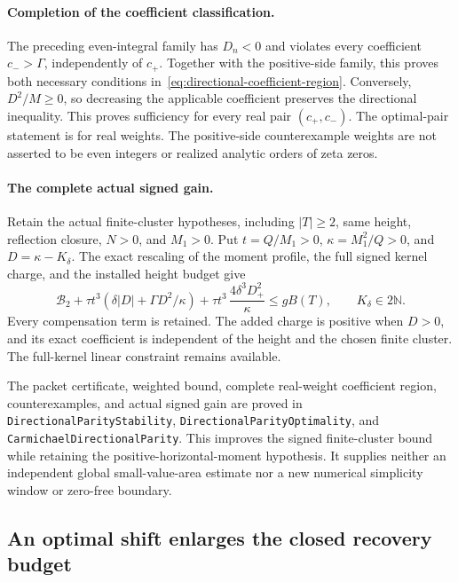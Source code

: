 \paragraph{Completion of the coefficient classification.}
The preceding even-integral family has \(D_n<0\) and violates every
coefficient \(c_->\Gamma\), independently of \(c_+\).
Together with the positive-side family, this proves both necessary
conditions in~\eqref{eq:directional-coefficient-region}.
Conversely, \(D^2/M\ge0\), so decreasing the applicable coefficient
preserves the directional inequality.  This proves sufficiency for
every real pair \((c_+,c_-)\).
The optimal-pair statement is for real weights.  The positive-side
counterexample weights are not asserted to be even integers or realized
analytic orders of zeta zeros.

\paragraph{The complete actual signed gain.}
Retain the actual finite-cluster hypotheses, including \(|T|\ge2\),
same height, reflection closure, \(N>0\), and \(M_1>0\).
Put \(t=Q/M_1>0\), \(\kappa=M_1^2/Q>0\), and
\(D=\kappa-K_\delta\).
The exact rescaling of the moment profile, the full signed kernel
charge, and the installed height budget give
\begin{equation}\label{eq:actual-directional-signed-gain}
 \mathcal B_2+\tau t^3
   \left(\delta|D|+\Gamma D^2/\kappa\right)
   +\tau t^3\,\frac{4\delta^3D_+^2}{\kappa}
 \le gB(T),\qquad K_\delta\in2\mathbb N.
\end{equation}
Every compensation term is retained.  The added charge is positive
when \(D>0\), and its exact coefficient is independent of the height
and the chosen finite cluster.  The full-kernel linear constraint
remains available.

The packet certificate, weighted bound, complete real-weight coefficient
region, counterexamples, and actual signed gain are proved in
\texttt{DirectionalParityStability},
\texttt{DirectionalParityOptimality}, and
\texttt{CarmichaelDirectionalParity}.
This improves the signed finite-cluster bound while retaining the
positive-horizontal-moment hypothesis.  It supplies neither an
independent global small-value-area estimate nor a new numerical
simplicity window or zero-free boundary.

\subsection{An optimal shift enlarges the closed recovery budget}
\label{sec:shifted-parity-recovery}

